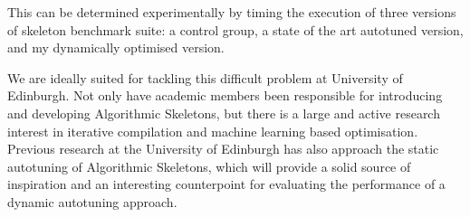 This can be determined experimentally by timing the execution of three
versions of skeleton benchmark suite: a control group, a state of the
art autotuned version, and my dynamically optimised version.




We are ideally suited for tackling this difficult problem at
University of Edinburgh. Not only have academic members been
responsible for introducing and developing Algorithmic Skeletons, but
there is a large and active research interest in iterative compilation
and machine learning based optimisation. Previous research at the
University of Edinburgh has also approach the static autotuning of
Algorithmic Skeletons, which will provide a solid source of
inspiration and an interesting counterpoint for evaluating the
performance of a dynamic autotuning approach.


